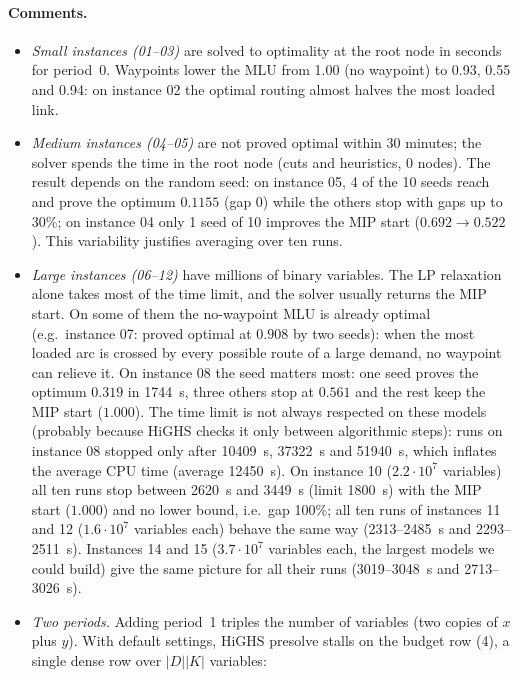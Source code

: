 \documentclass[11pt,a4paper]{article}
\begin{document}
\paragraph{Comments.}
\begin{itemize}
\item \emph{Small instances (01--03)} are solved to optimality at the root node in seconds for period~0.
Waypoints lower the MLU from 1.00 (no waypoint) to 0.93, 0.55 and 0.94: on instance 02 the
optimal routing almost halves the most loaded link.
\item \emph{Medium instances (04--05)} are not proved optimal within 30 minutes; the solver spends the time in
the root node (cuts and heuristics, 0 nodes). The result depends on the random seed: on instance 05, 4 of the 10 seeds
reach and prove the optimum $0.1155$ (gap 0) while the others stop with gaps up to 30\%; on instance 04 only 1 seed of 10
improves the MIP start ($0.692\to0.522$). This variability justifies averaging over ten runs.
\item \emph{Large instances (06--12)} have millions of binary variables. The LP relaxation alone takes most of
the time limit, and the solver usually returns the MIP start. On some of them the no-waypoint MLU is already
optimal (e.g.\ instance 07: proved optimal at $0.908$ by two seeds): when the most loaded arc is crossed by
every possible route of a large demand, no waypoint can relieve it. On instance 08 the seed matters most: one seed
proves the optimum $0.319$ in 1744~s, three others stop at $0.561$ and the rest keep the MIP start ($1.000$).
The time limit is not always respected on these
models (probably because HiGHS checks it only between algorithmic steps): runs on instance 08 stopped only after
10409~s, 37322~s and 51940~s, which inflates the average CPU time (average 12450~s). On instance 10 ($2.2\cdot10^7$ variables) all ten runs
stop between 2620~s and 3449~s (limit 1800~s) with the MIP start ($1.000$) and no lower bound, i.e.\ gap 100\%;
all ten runs of instances 11 and 12 ($1.6\cdot10^7$ variables each) behave the same way (2313--2485~s and
2293--2511~s). Instances 14 and 15 ($3.7\cdot10^7$ variables each, the largest models we could build) give the same
picture for all their runs (3019--3048~s and 2713--3026~s).
\item \emph{Two periods.} Adding period~1 triples the number of variables (two copies of $x$ plus $y$).
With default settings, HiGHS presolve stalls on the budget row (4), a single dense row over $|D||K|$ variables:

\end{itemize}
\end{document}
